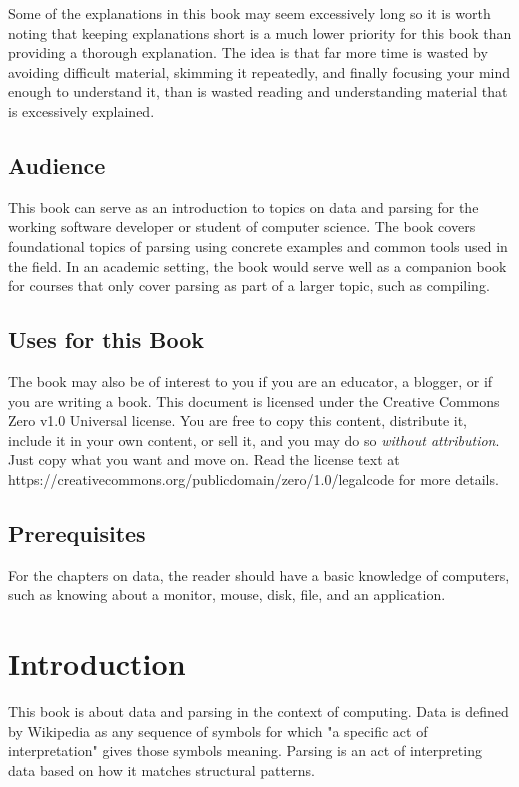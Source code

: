 \documentclass{book}
\begin{document}
Some of the explanations in this book may seem excessively long so it is
worth noting that keeping explanations short is a much lower priority
for this book than providing a thorough explanation. The idea is that far
more time is wasted by avoiding difficult material, skimming it repeatedly,
and finally focusing your mind enough to understand it, than is wasted
reading and understanding material that is excessively explained.


\section*{Audience}
This book can serve as an introduction to topics on data and parsing for
the working software developer or student of computer science. The book
covers foundational topics of parsing using concrete examples and common
tools used in the field. In an academic setting, the book would serve well as
a companion book for courses that only cover parsing as part of a larger
topic, such as compiling.

\section*{Uses for this Book}
The book may also be of interest to you if you are an educator, a blogger,
or if you are writing a book. This document is licensed under the Creative
Commons Zero v1.0 Universal license. You are free to copy this content,
distribute it, include it in your own content, or sell it, and you may do so
\textit{without attribution}. Just copy what you want and move on.  Read the
license text at https://creativecommons.org/publicdomain/zero/1.0/legalcode
for more details.

\section*{Prerequisites}
For the chapters on data, the reader should have a basic knowledge of
computers, such as knowing about a monitor, mouse, disk, file, and an
application.

\setcounter{tocdepth}{3}
\tableofcontents

\mainmatter

\chapter{Introduction}
This book is about data and parsing in the context of computing. Data is
defined by Wikipedia as any sequence of symbols for which "a specific act of
interpretation" gives those symbols meaning. Parsing is an act of
interpreting data based on how it matches structural patterns.

\backmatter
{}
\printindex
\end{document}
